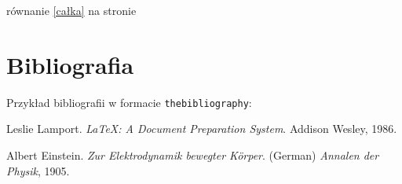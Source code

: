 \documentclass{article}
\theoremstyle{definition}
\begin{document}
	równanie \eqref{całka} na stronie \pageref{całka}
	
	\section{Bibliografia}
	Przykład bibliografii w formacie \texttt{thebibliography}:
	
	\begin{thebibliography}{9}
		
		Leslie Lamport. 
		\textit{LaTeX: A Document Preparation System}. 
		Addison Wesley, 1986.
		
		Albert Einstein. 
		\textit{Zur Elektrodynamik bewegter Körper}. (German) 
		\textit{Annalen der Physik}, 1905.
		
	\end{thebibliography}
	
	
\end{document}
